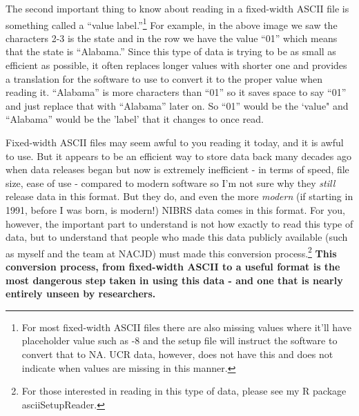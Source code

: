 \documentclass[
  12pt,
  openany]{book}
\begin{document}
The second important thing to know about reading in a fixed-width ASCII file is something called a ``value label.''\footnote{For most fixed-width ASCII files there are also missing values where it'll have placeholder value such as -8 and the setup file will instruct the software to convert that to NA. UCR data, however, does not have this and does not indicate when values are missing in this manner.} For example, in the above image we saw the characters 2-3 is the state and in the row we have the value ``01'' which means that the state is ``Alabama.'' Since this type of data is trying to be as small as efficient as possible, it often replaces longer values with shorter one and provides a translation for the software to use to convert it to the proper value when reading it. ``Alabama'' is more characters than ``01'' so it saves space to say ``01'' and just replace that with ``Alabama'' later on. So ``01'' would be the `value" and ``Alabama'' would be the 'label' that it changes to once read.

Fixed-width ASCII files may seem awful to you reading it today, and it is awful to use. But it appears to be an efficient way to store data back many decades ago when data releases began but now is extremely inefficient - in terms of speed, file size, ease of use - compared to modern software so I'm not sure why they \emph{still} release data in this format. But they do, and even the more \emph{modern} (if starting in 1991, before I was born, is modern!) NIBRS data comes in this format. For you, however, the important part to understand is not how exactly to read this type of data, but to understand that people who made this data publicly available (such as myself and the team at NACJD) must made this conversion process.\footnote{For those interested in reading in this type of data, please see my R package asciiSetupReader.} \textbf{This conversion process, from fixed-width ASCII to a useful format is the most dangerous step taken in using this data - and one that is nearly entirely unseen by researchers.}
\end{document}
